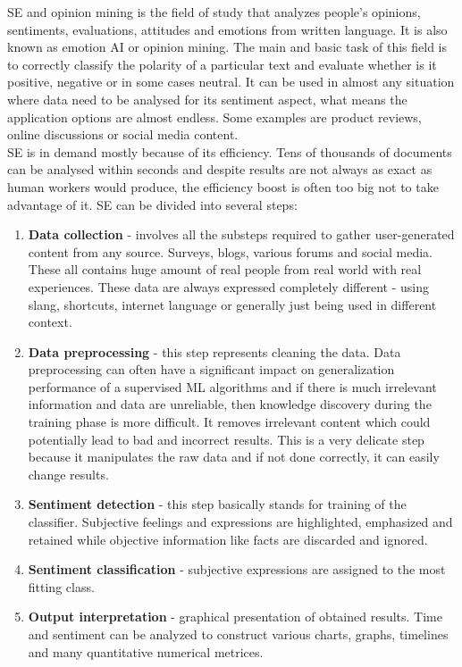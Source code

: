 SE and opinion mining is the field of study that analyzes people's opinions, sentiments, evaluations, attitudes and emotions from written language.\cite{liu2012sentiment} It is also known as emotion AI or opinion mining. The main and basic task of this field is to correctly classify the polarity of a particular text and evaluate whether is it positive, negative or in some cases neutral. It can be used in almost any situation where data need to be analysed for its sentiment aspect, what means the application options are almost endless.  Some examples are product reviews, online discussions or social media content.\\
SE is in demand mostly because of its efficiency. Tens of thousands of documents can be analysed within seconds and despite results are not always as exact as human workers would produce, the efficiency boost is often too big not to take advantage of it. SE can be divided into several steps:
\begin{enumerate}
  \item \textbf{Data collection} - involves all the substeps required to gather user-generated content from any source. Surveys, blogs, various forums and social media. These all contains huge amount of real people from real world with real experiences. These data are always expressed completely different - using slang, shortcuts, internet language or generally just being used in different context.
  \item \textbf{Data preprocessing} - this step represents cleaning the data. Data preprocessing can often have a significant impact on generalization performance of a supervised ML algorithms \cite{kotsiantis2006data} and if there is much irrelevant information and data are unreliable, then knowledge discovery during the training phase is more difficult. It removes irrelevant content which could potentially lead to bad and incorrect results. This is a very delicate step because it manipulates the raw data and if not done correctly, it can easily change results.
  \item \textbf{Sentiment detection} - this step basically stands for training of the classifier. Subjective feelings and expressions are highlighted, emphasized and retained while objective information like facts are discarded and ignored. 
  \item \textbf{Sentiment classification} - subjective expressions are assigned to the most fitting class.
    \item \textbf{Output interpretation} - graphical presentation of obtained results. Time and sentiment can be analyzed to construct various charts, graphs, timelines and many quantitative numerical metrices.
\end{enumerate}

